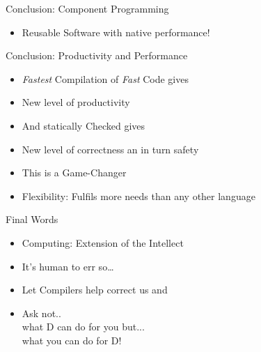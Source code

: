 \documentclass[xcolor=dvipsnames]{beamer}
\begin{document}
\begin{frame}[fragile]{Conclusion: Component Programming}
  \begin{figure}
  \end{figure}
  \begin{itemize}[<+->]
  Features come together in an elegant and concise harmony
  \item Reusable Software with native performance!
  \end{itemize}
\end{frame}

\begin{frame}[fragile]{Conclusion: Productivity and Performance}
  \begin{itemize}[<+->]
  \item \emph{Fastest} Compilation of \emph{Fast} Code gives
  \item New level of productivity
  \item And statically Checked gives
  \item New level of correctness an in turn safety
  \item This is a Game-Changer
  \item Flexibility: Fulfils more needs than any other language
  \end{itemize}
\end{frame}

\begin{frame}[fragile]{Final Words}
  \begin{itemize}[<+->]
  \item Computing: Extension of the Intellect
  \item It's human to err so\ldots
  \item Let Compilers help correct us and
  \item Ask not..\\
    what D can do for you but...\\
    what you can do for D!
  \end{itemize}
\end{frame}
\end{document}
